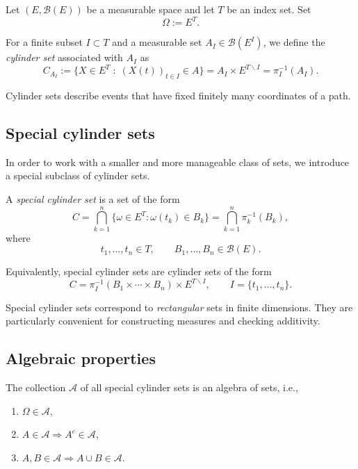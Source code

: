 \begin{definition}
Let $(E,\mathcal{B}(E))$ be a measurable space and let $T$ be an index set.
Set
\[
\Omega := E^T.
\]

For a finite subset $I \subset T$ and a measurable set $A_I \in \mathcal{B}(E^I)$, we define
the \emph{cylinder set} associated with $A_I$ as
\[
C_{A_I}
:=
\bigl\{
X \in E^T \;:\; (X(t))_{t \in I} \in A
\bigr\}
= A_I \times E^{T \backslash I} = \pi_I^{-1}(A_I).
\]
\end{definition}


Cylinder sets describe events that have fixed finitely many coordinates of a path.

\subsection*{Special cylinder sets}

In order to work with a smaller and more manageable class of sets, we introduce
a special subclass of cylinder sets.

\begin{definition}
A \emph{special cylinder set} is a set of the form
\[
C
=
\bigcap_{k=1}^n \{ \omega \in E^T : \omega(t_k) \in B_k \} = \bigcap_{k=1}^n \pi_k^{-1}(B_k),
\]
where
\[
t_1,\dots,t_n \in T,
\qquad
B_1,\dots,B_n \in \mathcal{B}(E).
\]
\end{definition}

Equivalently, special cylinder sets are cylinder sets of the form
\[
C = \pi_I^{-1}(B_1 \times \cdots \times B_n) \times E^{T \backslash I},
\qquad
I = \{t_1,\dots,t_n\}.
\]

\begin{remark}
Special cylinder sets correspond to \emph{rectangular} sets in finite dimensions.
They are particularly convenient for constructing measures and checking additivity.
\end{remark}

\subsection*{Algebraic properties}

\begin{lemma}
The collection $\mathcal{A}$ of all special cylinder sets is an algebra of sets, i.e.,
\begin{enumerate}[label=(\roman*)]
\item $\Omega \in \mathcal{A}$,
\item $A \in \mathcal{A} \Rightarrow A^c \in \mathcal{A}$,
\item $A,B \in \mathcal{A} \Rightarrow A \cup B \in \mathcal{A}$.
\end{enumerate}
\end{lemma}

